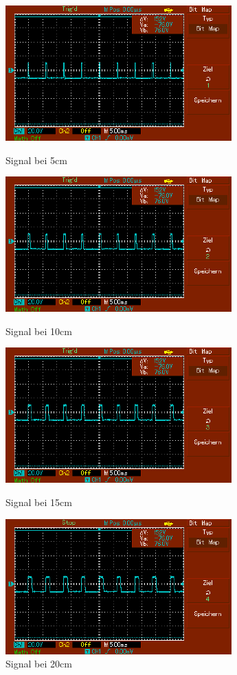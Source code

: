 \documentclass[captions=tableheading]{scrartcl}
\begin{document}
\begin{itemize}
\begin{figure}
                \includegraphics{Lock_In Bilder/Aufgabe 4/MAP001.pdf}
                \caption{Signal bei 5cm}
                \label{fig:5cmled}
                
                \includegraphics{Lock_In Bilder/Aufgabe 4/MAP002.pdf}
                \caption{Signal bei 10cm}
                \label{fig:10cmled}
                
                \includegraphics{Lock_In Bilder/Aufgabe 4/MAP003.pdf}
                \caption{Signal bei 15cm}
                \label{fig:15cmled}
                
                \includegraphics{Lock_In Bilder/Aufgabe 4/MAP004.pdf}
                \caption{Signal bei 20cm}
                \label{fig:20cmled}
                

\end{figure}
\end{itemize}
\end{document}
